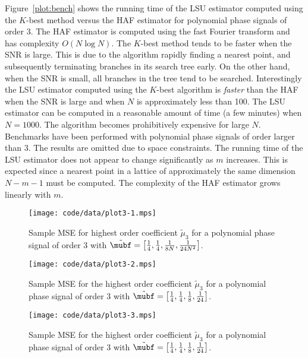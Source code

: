 \documentclass[journal]{IEEEtran}
\begin{document}
Figure~\ref{plot:bench} shows the running time of the LSU estimator computed using the $K$-best method versus the HAF estimator for polynomial phase signals of order 3.  The HAF estimator is computed using the fast Fourier transform and has complexity $O(N \log N)$.   The $K$-best method tends to be faster when the SNR is large.  This is due to the algorithm rapidly finding a nearest point, and subsequently terminating branches in its search tree early.  On the other hand, when the SNR is small, all branches in the tree tend to be searched.  Interestingly the LSU estimator computed using the $K$-best algorithm is \emph{faster} than the HAF when the SNR is large and when $N$ is approximately less than 100.  The LSU estimator can be computed in a reasonable amount of time (a few minutes) when $N=1000$.  The algorithm becomes prohibitively expensive for large $N$.  Benchmarks have been performed with polynomial phase signals of order larger than $3$.  The results are omitted due to space constraints.  The running time of the LSU estimator does not appear to change significantly as $m$ increases.  This is expected since a nearest point in a lattice of approximately the same dimension $N-m-1$ must be computed.  The complexity of the HAF estimator grows linearly with $m$.

\begin{figure}[p] 
   	\centering 
  		\texttt{[image: code/data/plot3-1.mps]} 
  		\caption{Sample MSE for highest order coefficient $\tilde{\mu}_3$ for a polynomial phase signal of order 3 with $\tilde{\mubf} = \left[ \tfrac{1}{4}, \tfrac{1}{4}, \tfrac{1}{8N}, \tfrac{1}{24N^2}  \right]$.} 
  		\label{plot:m3small} 
 \end{figure} 

\begin{figure}[p] 
   	\centering 
  		\texttt{[image: code/data/plot3-2.mps]} 
  		\caption{Sample MSE for the highest order coefficient $\tilde{\mu}_3$ for a polynomial phase signal of order 3 with $\tilde{\mubf} = \left[ \tfrac{1}{4}, \tfrac{1}{4}, \tfrac{1}{8}, \tfrac{1}{24}  \right]$.} 
  		\label{plot:m3big} 
 \end{figure} 

\begin{figure}[p] 
   	\centering 
  		\texttt{[image: code/data/plot3-3.mps]} 
  		\caption{Sample MSE for the highest order coefficient $\tilde{\mu}_3$ for a polynomial phase signal of order 3 with $\tilde{\mubf} = \left[ \tfrac{1}{4}, \tfrac{1}{4}, \tfrac{1}{8}, \tfrac{1}{24}  \right]$.} 
  		\label{plot:m3bigzw} 
 \end{figure} 
\end{document}
